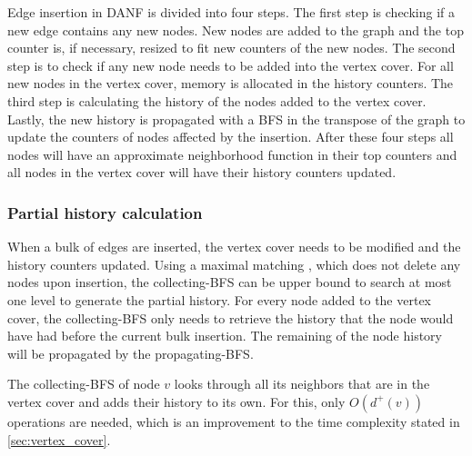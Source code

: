 Edge insertion in DANF is divided into four steps. The first step is checking if a new edge contains any new nodes. New nodes are added to the graph and the top counter is, if necessary, resized to fit new counters of the new nodes. The second step is to check if any new node needs to be added into the vertex cover. For all new nodes in the vertex cover, memory is allocated in the history counters. The third step is calculating the history of the nodes added to the vertex cover. Lastly, the new history is propagated with a BFS in the transpose of the graph to update the counters of nodes affected by the insertion. After these four steps all nodes will have an approximate neighborhood function in their top counters and all nodes in the vertex cover will have their history counters updated. 

\subsubsection{Partial history calculation}
When a bulk of edges are inserted, the vertex cover needs to be modified and the history counters updated. Using a maximal matching \cite{2appdynvc}, which does not delete any nodes upon insertion, the collecting-BFS can be upper bound to search at most one level to generate the partial history. For every node added to the vertex cover, the collecting-BFS only needs to retrieve the history that the node would have had before the current bulk insertion. The remaining of the node history will be propagated by the propagating-BFS.

The collecting-BFS of node $v$ looks through all its neighbors that are in the vertex cover and adds their history to its own. For this, only $O(d^+(v))$ operations are needed, which is an improvement to the time complexity stated in \ref{sec:vertex_cover}. \\

